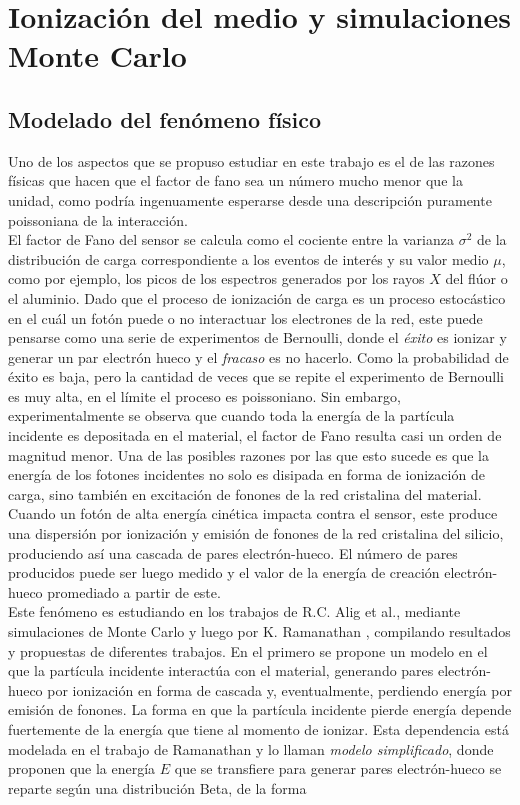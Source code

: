 \chapter{Ionización del medio y simulaciones Monte Carlo}
\section{Modelado del fenómeno físico}
\noindent Uno de los aspectos que se propuso estudiar en este trabajo es el de las razones físicas que hacen que el factor de fano sea un número mucho menor que la unidad, como podría ingenuamente esperarse desde una descripción puramente poissoniana de la interacción.\\
\indent El factor de Fano del sensor se calcula como el cociente entre la varianza $\sigma^{2}$ de la distribución de carga correspondiente a los eventos de interés y su valor medio $\mu$, como por ejemplo, los picos de los espectros generados por los rayos $X$ del flúor o el aluminio. Dado que el proceso de ionización de carga es un proceso estocástico en el cuál un fotón puede o no interactuar los electrones de la red, este puede pensarse como una serie de experimentos de Bernoulli, donde el \textit{éxito} es ionizar y generar un par electrón hueco y el \textit{fracaso} es no hacerlo. Como la probabilidad de éxito es baja, pero la cantidad de veces que se repite el experimento de Bernoulli es muy alta, en el límite el proceso es poissoniano. Sin embargo, experimentalmente se observa que cuando toda la energía de la partícula incidente es depositada en el material, el factor de Fano resulta casi un orden de magnitud menor\cite{TesisKevin}. Una de las posibles razones por las que esto sucede es que la energía de los fotones incidentes no solo es disipada en forma de ionización de carga, sino también en excitación de fonones de la red cristalina del material.\\
\indent Cuando un fotón de alta energía cinética impacta contra el sensor, este produce una dispersión por ionización y emisión de fonones de la red cristalina del silicio, produciendo así una cascada de pares electrón-hueco. El número de pares producidos puede ser luego medido y el valor de la energía de creación electrón-hueco promediado a partir de este.\\
\indent Este fenómeno es estudiando en los trabajos de R.C. Alig et al.\cite{Alig}, mediante simulaciones de Monte Carlo y luego por K. Ramanathan \cite{Ramanathan}, compilando resultados y propuestas de diferentes trabajos. En el primero se propone un modelo en el que la partícula incidente interactúa con el material, generando pares electrón-hueco por ionización en forma de cascada y, eventualmente, perdiendo energía por emisión de fonones. La forma en que la partícula incidente pierde energía depende fuertemente de la energía que tiene al momento de ionizar. Esta dependencia está modelada en el trabajo de Ramanathan\cite{Ramanathan} y lo llaman \textit{modelo simplificado}, donde proponen que la energía $E$ que se transfiere para generar pares electrón-hueco se reparte según una distribución Beta, de la forma
